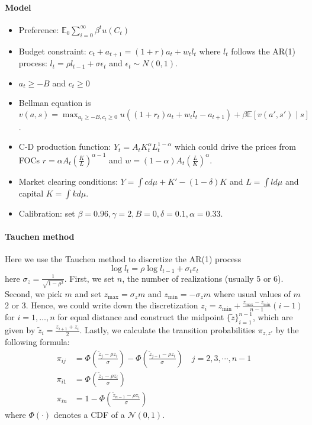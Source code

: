 \documentclass[11pt,a4paper]{article}
\begin{document}
\paragraph{Model\citep{Aiyagari1994}}
\begin{itemize}
    \item Preference: $\mathbb{E}_0\sum_{i=0}^\infty \beta^t u(C_t)$ 
    \item Budget constraint: $c_t + a_{t+1} = (1+r)a_t + w_t l_t$ where $l_t$ follows the AR(1) process: $l_t = \rho l_{t-1}+\sigma\epsilon_t$ and $\epsilon_t \sim N(0,1)$. 
    \item $a_t \geq -B$ and $c_t\geq 0$
    \item Bellman equation is $v(a,s) = \max_{a_t\geq -B,c_t\geq 0 } u((1+r_t)a_t+w_t l_t-a_{t+1})+ \beta \mathbb{E}[v(a',s')\mid s]$.
    \item C-D production function: $Y_t = A_t K^\alpha_t L^{1-\alpha}_t$ which could drive the prices from FOCs $r = \alpha A_t\left(\frac{K}{L}\right)^{\alpha-1}$ and $w = (1-\alpha )A_t \left(\frac{L}{K}\right)^{\alpha }$. 
    \item Market clearing conditions: $Y = \int c d\mu + K' -(1-\delta )K$ and $L = \int l d\mu$ and capital $K = \int k d\mu$. 
    \item Calibration: set $\beta = 0.96,\gamma=2,B=0,\delta = 0.1,\alpha=0.33$. 
\end{itemize}

\paragraph{Tauchen method} Here we use the Tauchen method to discretize the AR(1) process $$ \log l_t = \rho \log l_{t-1}+\sigma_t \varepsilon_t $$
here $\sigma_z = \frac{1}{\sqrt{1-\rho^2}}$. First, we set $n$, the number of realizations (usually 5 or 6). Second, we pick $m$ and set $z_{\max} = \sigma_z m$ and $z_{\min} = -\sigma_z m$ where usual values of $m$ 2 or 3. Hence, we could write down the discretization $z_i=z_{\min} + \frac{z_{\max}-z_{\min}}{n-1}(i-1)$ for $i=1,\ldots,n$ for equal distance and construct the midpoint $\{\tilde{z}\}_{i=1}^{n-1}$, which are given by $\tilde{z}_i = \frac{z_{i+1}+z_i}{2}$. Lastly, we calculate the transition probabilities $\pi_{z,z'}$ by the following formula: 
\begin{equation}
    \begin{aligned}
        \pi_{ij} &= \Phi \left(\frac{\tilde{z}_j-\rho z_i}{\sigma}\right)- \Phi \left(\frac{\tilde{z}_{j-1}-\rho z_i}{\sigma}\right) \quad j=2,3,\cdots,n-1\\ 
        \pi_{i1} &= \Phi \left(\frac{\tilde{z}_1-\rho z_i}{\sigma}\right)\\
        \pi_{in} &= 1 - \Phi \left(\frac{\tilde{z}_{n-1}-\rho z_i}{\sigma}\right)
    \end{aligned}
\end{equation}
where $\Phi(\cdot)$ denotes a CDF of a $\mathcal{N}(0,1)$. 
\end{document}
